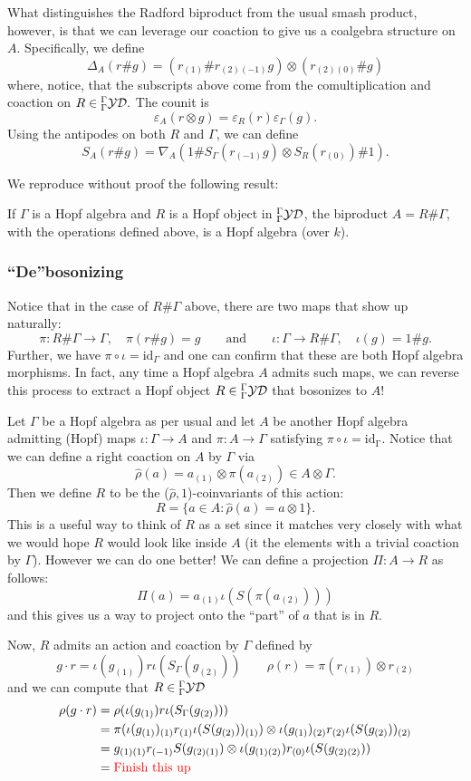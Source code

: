 \documentclass[12pt]{article}
\begin{document}
What distinguishes the Radford biproduct from the usual smash product, however, is that we can leverage our coaction to give us a coalgebra structure on $A$. Specifically, we define
\[\Delta_A(r\# g)=(r_{(1)}\# r_{(2)(-1)}g)\otimes(r_{(2)(0)}\# g)\]
where, notice, that the subscripts above come from the comultiplication and coaction on $R\in{^\Gamma_\Gamma\mathcal{YD}}.$ The counit is
\[\varepsilon_A(r\otimes g)=\varepsilon_R(r)\varepsilon_\Gamma(g).\]
Using the antipodes on both $R$ and $\Gamma$, we can define
\[S_A(r\# g)=\nabla_A(1\#S_\Gamma(r_{(-1)}g)\otimes S_R(r_{(0)})\# 1).\]

We reproduce without proof the following result:
\begin{thm}
    If $\Gamma$ is a Hopf algebra and $R$ is a Hopf object in ${^\Gamma_\Gamma\mathcal{YD}}$, the biproduct $A=R\# \Gamma$, with the operations defined above, is a Hopf algebra (over $k$).
\end{thm}

\subsubsection{``De''bosonizing}
Notice that in the case of $R\#\Gamma$ above, there are two maps that show up naturally:
\[\pi:R\#\Gamma\to \Gamma,\quad \pi(r\# g)=g\qquad\text{and}\qquad \iota:\Gamma\to R\# \Gamma,\quad \iota(g)=1\# g.\]
Further, we have $\pi\circ\iota=\mathrm{id}_{\Gamma}$ and one can confirm that these are both Hopf algebra morphisms. In fact, any time a Hopf algebra $A$ admits such maps, we can reverse this process to extract a Hopf object $R\in{^\Gamma_\Gamma\mathcal{YD}}$ that bosonizes to $A$!

Let $\Gamma$ be a Hopf algebra as per usual and let $A$ be another Hopf algebra admitting (Hopf) maps $\iota:\Gamma\to A$ and $\pi:A\to \Gamma$ satisfying $\pi\circ\iota=\mathrm{id_\Gamma}.$ Notice that we can define a right coaction on $A$ by $\Gamma$ via
\[\hat\rho(a)=a_{(1)}\otimes\pi(a_{(2)})\in A\otimes \Gamma.\]
Then we define $R$ to be the ($\hat\rho,1$)-coinvariants of this action:
\[R=\{a\in A:\hat\rho(a)=a\otimes 1\}.\]
This is a useful way to think of $R$ as a set since it matches very closely with what we would hope $R$ would look like inside $A$ (it the elements with a trivial coaction by $\Gamma$). However we can do one better! We can define a projection $\Pi:A\to R$ as follows:
\[\Pi(a)=a_{(1)}\iota(S(\pi(a_{(2)})))\]
and this gives us a way to project onto the ``part'' of $a$ that is in $R$.

Now, $R$ admits an action and coaction by $\Gamma$ defined by
\[g\cdot r = \iota(g_{(1)})r\iota(S_\Gamma(g_{(2)}))\qquad \rho(r)=\pi(r_{(1)})\otimes r_{(2)}\]
and we can compute that $R\in{^\Gamma_\Gamma\mathcal{YD}}$
\begin{align*}
    \rho(g\cdot r)&=\rho(\iota(g_{(1)})r\iota(S_\Gamma(g_{(2)})))\\
    &=\pi(\iota(g_{(1)})_{(1)}r_{(1)}\iota(S(g_{(2)}))_{(1)})\otimes\iota(g_{(1)})_{(2)}r_{(2)}\iota(S(g_{(2)}))_{(2)}\\
    &= g_{(1)(1)}r_{(-1)}S(g_{(2)(1)})\otimes \iota(g_{(1)(2)})r_{(0)}\iota(S(g_{(2)(2)}))\\
    &={\text{\color{red}Finish this up}}
\end{align*}
\end{document}
